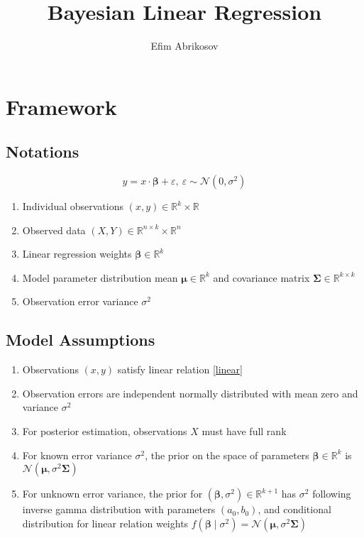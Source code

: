 \documentclass[10pt,fleqn]{amsart}
\theoremstyle{definition}
\theoremstyle{remark}
\numberwithin{equation}{section}
\newcommand{\RR}{\mathbb{R}}
\newcommand{\bbeta}{\boldsymbol{\beta}}
\newcommand{\mmu}{\boldsymbol{\mu}}
\newcommand{\SSigma}{\boldsymbol{\Sigma}}
\begin{document}
\title{Bayesian Linear Regression}
\author{Efim Abrikosov}
\maketitle

\section{Framework}
\subsection{Notations}
\begin{equation}\label{linear}
    y = x\cdot \bbeta +\varepsilon,\ \varepsilon \sim\mathcal{N}(0,\sigma^2)
\end{equation}

\begin{enumerate}
    \item Individual observations $(x, y) \in \RR^k\times \RR$
    \item Observed data $(X, Y)\in \RR^{n\times k}\times \RR^n$
    \item Linear regression weights  $\bbeta \in \RR^k$
    \item Model parameter distribution mean $\mmu \in \RR^k$ and covariance matrix $\SSigma \in \RR^{k\times k}$
    \item Observation error variance $\sigma^2$
\end{enumerate}

\subsection{Model Assumptions}
\begin{enumerate}
    \item Observations $(x, y)$ satisfy linear relation \ref{linear}
    \item Observation errors are independent normally distributed with mean zero and variance $\sigma^2$
    \item For posterior estimation, observations $X$ must have full rank
    \item For known error variance $\sigma^2$, the prior on the space of parameters $\bbeta\in\RR^k$ is $\mathcal{N}(\mmu,\sigma^2\SSigma)$
    \item For unknown error variance, the prior for $(\bbeta, \sigma^2)\in\RR^{k+1}$ has $\sigma^2$ following inverse gamma distribution 
    with parameters $(a_0, b_0)$, and conditional distribution for linear relation weights $f(\bbeta\mid\sigma^2)=\mathcal{N}(\mmu,\sigma^2\SSigma)$
\end{enumerate}
\end{document}

